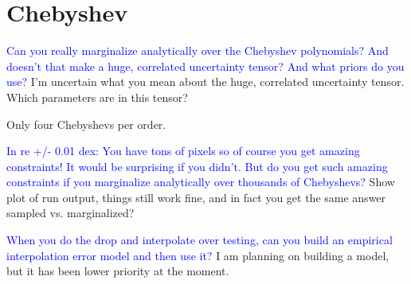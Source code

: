\documentclass[preprint]{aastex} %
\newcommand{\hcom}[1]{ \textcolor{Blue}{#1}}
\begin{document}
\section{Chebyshev}
\hcom{Can you really marginalize analytically over the Chebyshev polynomials? And doesn't that make a huge, correlated uncertainty tensor? And what priors do you use?}
I'm uncertain what you mean about the huge, correlated uncertainty tensor. Which parameters are in this tensor? 

Only four Chebyshevs per order.

\hcom{In re +/- 0.01 dex: You have tons of pixels so of course you get amazing constraints! It would be surprising if you didn't. But do you get such amazing constraints if you marginalize analytically over thousands of Chebyshevs?}
Show plot of run output, things still work fine, and in fact you get the same answer sampled vs. marginalized?

\hcom{When you do the drop and interpolate over testing, can you build an empirical interpolation error model and then use it?}
I am planning on building a model, but it has been lower priority at the moment. 








\end{document}
